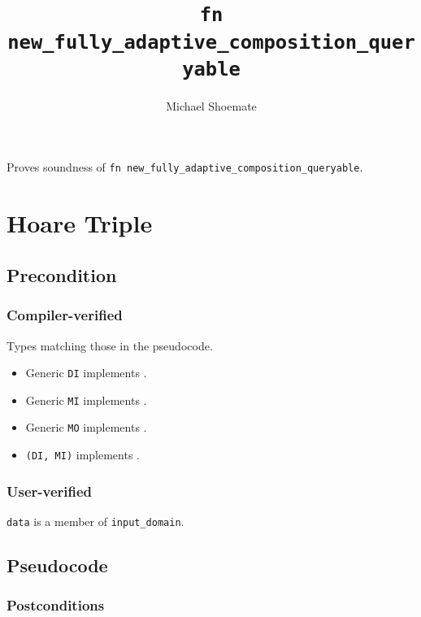 \documentclass{article}
\title{\texttt{fn new\_fully\_adaptive\_composition\_queryable}}
\author{Michael Shoemate}
\date{}
\begin{document}
\maketitle

\contrib
Proves soundness of \texttt{fn new\_fully\_adaptive\_composition\_queryable}.

\section{Hoare Triple}
\subsection*{Precondition}
\subsubsection*{Compiler-verified}
Types matching those in the pseudocode.

\begin{itemize}
    \item Generic \texttt{DI} implements .
    \item Generic \texttt{MI} implements .
    \item Generic \texttt{MO} implements .
    \item \texttt{(DI, MI)} implements .
\end{itemize}

\subsubsection*{User-verified}
\texttt{data} is a member of \texttt{input\_domain}.


\subsection*{Pseudocode}


\subsubsection*{Postconditions}
\begin{theorem}
\end{theorem}
\end{document}
